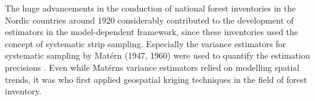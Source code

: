 The huge advancements in the conduction of national forest inventories in the Nordic countries around 1920 considerably contributed to the development of estimators in the model-dependent framework, since these inventories used the concept of systematic strip sampling. Especially the variance estimators for systematic sampling by Mat\'{e}rn (1947, 1960) were used to quantify the estimation precisions \citep{kangas2006}. Even while Mat\'{e}rns variance estimators relied on modelling spatial trends, it was \citet{mandallaz1993} who first applied geospatial kriging techniques in the field of forest inventory.\par


%
